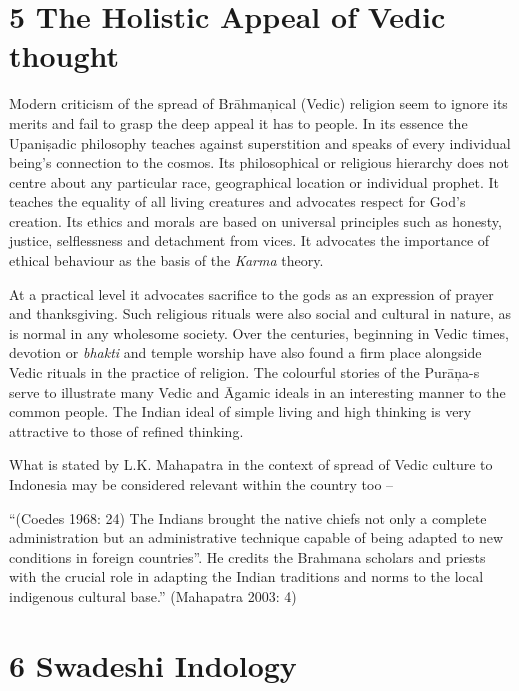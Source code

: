 \section*{5 The Holistic Appeal of Vedic thought}

Modern criticism of the spread of Brāhmaņical (Vedic) religion seem to ignore its merits and fail to grasp the deep appeal it has to people. In its essence the Upaniṣadic philosophy teaches against superstition and speaks of every individual being’s connection to the cosmos. Its philosophical or religious hierarchy does not centre about any particular race, geographical location or individual prophet. It teaches the equality of all living creatures and advocates respect for God’s creation. Its ethics and morals are based on universal principles such as honesty, justice, selflessness and detachment from vices. It advocates the importance of ethical behaviour as the basis of the \textit{Karma} theory.

At a practical level it advocates sacrifice to the gods as an expression of prayer and thanksgiving. Such religious rituals were also social and cultural in nature, as is normal in any wholesome society. Over the centuries, beginning in Vedic times, devotion or \textit{bhakti} and temple worship have also found a firm place alongside Vedic rituals in the practice of religion. The colourful stories of the Purāņa-s serve to illustrate many Vedic and Āgamic ideals in an interesting manner to the common people. The Indian ideal of simple living and high thinking is very attractive to those of refined thinking. 

What is stated by L.K. Mahapatra in the context of spread of Vedic culture to Indonesia may be considered relevant within the country too –

\begin{myquote}
“(Coedes 1968: 24) The Indians brought the native chiefs not only a complete administration but an administrative technique capable of being adapted to new conditions in foreign countries”. He credits the Brahmana scholars and priests with the crucial role in adapting the Indian traditions and norms to the local indigenous cultural base.” (Mahapatra 2003: 4)
\end{myquote}


\section*{6 Swadeshi Indology}


